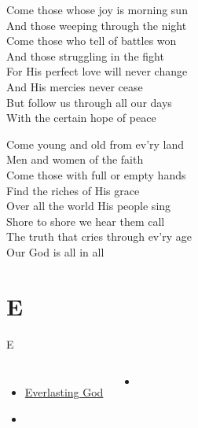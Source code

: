 \documentclass[aspectratio=169]{beamer}
\begin{document}
{\begin{frame}{}
\end{frame}
\hypertarget{Come, people of the Risen King[]2}{}
\begin{frame}{}
\fontsize{18.75}{22.5}\selectfont

Come those whose joy is morning sun\\ 
And those weeping through the night\\ 
Come those who tell of battles won\\ 
And those struggling in the fight\\ 
For His perfect love will never change\\ 
And His mercies never cease\\ 
But follow us through all our days\\ 
With the certain hope of peace

\end{frame}
\hypertarget{Come, people of the Risen King[]3}{}
\begin{frame}{}
\fontsize{18.75}{22.5}\selectfont

Come young and old from ev'ry land\\ 
Men and women of the faith\\ 
Come those with full or empty hands\\ 
Find the riches of His grace\\ 
Over all the world His people sing\\ 
Shore to shore we hear them call\\ 
The truth that cries through ev'ry age\\ 
Our God is all in all

\end{frame}
}

\section{ E }

\begin{frame}[t]{E}
\begin{columns}[t]
\begin{itemize}
    \item \hyperlink{Everlasting God['Strength will rise']}{Everlasting God}
    \item[] \phantom{1}
\end{itemize}
\begin{itemize}
    \item[] \phantom{1}
\end{itemize}
\end{columns}
\end{frame}
\end{document}
